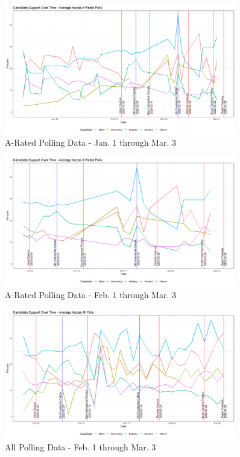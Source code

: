 \begin{figure}[H]
    \centering
    \includegraphics[width=0.9\textwidth]{figures/long-A-rated-polls.png}
    \caption{A-Rated Polling Data - Jan. 1 through Mar. 3}
    \label{Updated-Polling-Data-1}
\end{figure}

\begin{figure}[H]
    \centering
    \includegraphics[width=0.9\textwidth]{figures/A-rated-polls.png}
    \caption{A-Rated Polling Data - Feb. 1 through Mar. 3}
    \label{A-rated-polls}
\end{figure}

\begin{figure}[H]
    \centering
    \includegraphics[width=0.9\textwidth]{figures/All-rated-polls.png}
    \caption{All Polling Data - Feb. 1 through Mar. 3}
    \label{All-rated-polls}
\end{figure}

